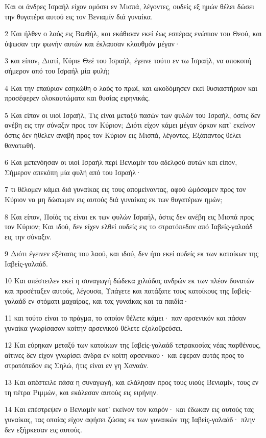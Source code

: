 \par Και οι άνδρες Ισραήλ είχον ομόσει εν Μισπά, λέγοντες, ουδείς εξ ημών θέλει δώσει την θυγατέρα αυτού εις τον Βενιαμίν διά γυναίκα.
\par 2 Και ήλθεν ο λαός εις Βαιθήλ, και εκάθισαν εκεί έως εσπέρας ενώπιον του Θεού, και ύψωσαν την φωνήν αυτών και έκλαυσαν κλαυθμόν μέγαν·
\par 3 και είπον, Διατί, Κύριε Θεέ του Ισραήλ, έγεινε τούτο εν τω Ισραήλ, να αποκοπή σήμερον από του Ισραήλ μία φυλή;
\par 4 Και την επαύριον εσηκώθη ο λαός το πρωΐ, και ωκοδόμησεν εκεί θυσιαστήριον και προσέφερεν ολοκαυτώματα και θυσίας ειρηνικάς.
\par 5 Και είπον οι υιοί Ισραήλ, Τις είναι μεταξύ πασών των φυλών του Ισραήλ, όστις δεν ανέβη εις την σύναξιν προς τον Κύριον; Διότι είχον κάμει μέγαν όρκον κατ' εκείνον όστις δεν ήθελεν αναβή προς τον Κύριον εις Μισπά, λέγοντες, Εξάπαντος θέλει θανατωθή.
\par 6 Και μετενόησαν οι υιοί Ισραήλ περί Βενιαμίν του αδελφού αυτών και είπον, Σήμερον απεκόπη μία φυλή από του Ισραήλ·
\par 7 τι θέλομεν κάμει διά γυναίκας εις τους απομείναντας, αφού ώμόσαμεν προς τον Κύριον να μη δώσωμεν εις αυτούς διά γυναίκας εκ των θυγατέρων ημών;
\par 8 Και είπον, Ποίός τις είναι εκ των φυλών Ισραήλ, όστις δεν ανέβη εις Μισπά προς τον Κύριον; Και ιδού, δεν είχεν ελθεί ουδείς εις το στρατόπεδον από Ιαβείς-γαλαάδ εις την σύναξιν.
\par 9 Διότι έγεινεν εξέτασις του λαού, και ιδού, δεν ήτο εκεί ουδείς εκ των κατοίκων της Ιαβείς-γαλαάδ.
\par 10 Και απέστειλεν εκεί η συναγωγή δώδεκα χιλιάδας ανδρών εκ των πλέον δυνατών και προσέταξεν αυτούς, λέγουσα, Υπάγετε και πατάξατε τους κατοίκους της Ιαβείς-γαλαάδ εν στόματι μαχαίρας, και τας γυναίκας και τα παιδία·
\par 11 και τούτο είναι το πράγμα, το οποίον θέλετε κάμει· παν αρσενικόν και πάσαν γυναίκα γνωρίσασαν κοίτην αρσενικού θέλετε εξολοθρεύσει.
\par 12 Και εύρηκαν μεταξύ των κατοίκων της Ιαβείς-γαλαάδ τετρακοσίας νέας παρθένους, αίτινες δεν είχον γνωρίσει άνδρα εν κοίτη αρσενικού· και έφεραν αυτάς προς το στρατόπεδον εις Σηλώ, ήτις είναι εν γη Χαναάν.
\par 13 Και απέστειλε πάσα η συναγωγή, και ελάλησαν προς τους υιούς Βενιαμίν, τους εν τη πέτρα Ριμμών, και εκάλεσαν αυτούς εις ειρήνην.
\par 14 Και επέστρεψεν ο Βενιαμίν κατ' εκείνον τον καιρόν· και έδωκαν εις αυτούς τας γυναίκας, τας οποίας είχον αφήσει ζώσας εκ των γυναικών της Ιαβείς-γαλαάδ· πλην δεν εξήρκεσαν εις αυτούς.
